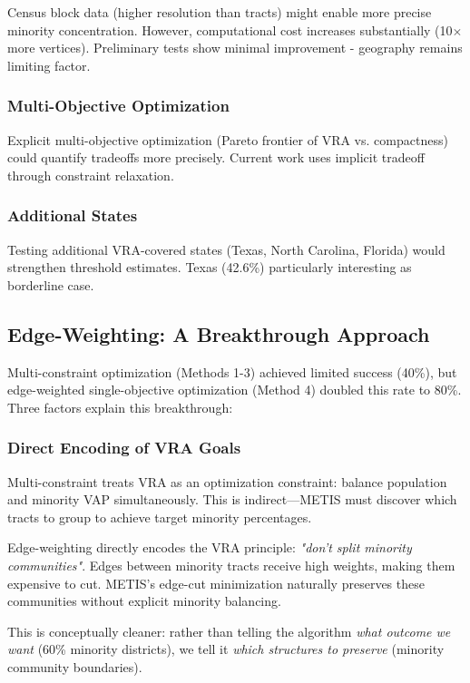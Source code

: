 Census block data (higher resolution than tracts) might enable more precise minority concentration. However, computational cost increases substantially (10$\times$ more vertices). Preliminary tests show minimal improvement - geography remains limiting factor.

\subsubsection{Multi-Objective Optimization}

Explicit multi-objective optimization (Pareto frontier of VRA vs. compactness) could quantify tradeoffs more precisely. Current work uses implicit tradeoff through constraint relaxation.

\subsubsection{Additional States}

Testing additional VRA-covered states (Texas, North Carolina, Florida) would strengthen threshold estimates. Texas (42.6\%) particularly interesting as borderline case.

\subsection{Edge-Weighting: A Breakthrough Approach}

Multi-constraint optimization (Methods 1-3) achieved limited success (40\%), but edge-weighted single-objective optimization (Method 4) doubled this rate to 80\%. Three factors explain this breakthrough:

\subsubsection{Direct Encoding of VRA Goals}

Multi-constraint treats VRA as an optimization constraint: balance population and minority VAP simultaneously. This is indirect—METIS must discover which tracts to group to achieve target minority percentages.

Edge-weighting directly encodes the VRA principle: \textit{"don't split minority communities"}. Edges between minority tracts receive high weights, making them expensive to cut. METIS's edge-cut minimization naturally preserves these communities without explicit minority balancing.

This is conceptually cleaner: rather than telling the algorithm \textit{what outcome we want} (60\% minority districts), we tell it \textit{which structures to preserve} (minority community boundaries).

